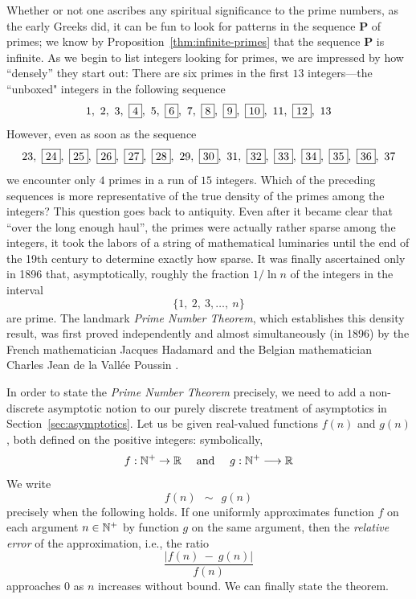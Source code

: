 Whether or not one ascribes any spiritual significance to the prime numbers, as the early Greeks did, it can be fun to look for patterns in the sequence {\bf P} of primes; we know by Proposition~\ref{thm:infinite-primes} that the sequence {\bf P} is infinite.  As we begin to list integers looking for primes, we are impressed by how ``densely'' they start out:  There are six primes in the first $13$ integers---the ``unboxed" integers in the following sequence
\[ 
1, \ 2, \ 3, \ \fbox{4}, \ 5, \ \fbox{6}, \ 7, \ \fbox{8}, \ \fbox{9}, \ \fbox{10}, \ 11, \ \fbox{12}, \ 13 
\] 
However, even as soon as the sequence
\[ 23, \ \fbox{24}, \ \fbox{25}, \ \fbox{26}, \ \fbox{27}, \ \fbox{28}, \ 29, \ \fbox{30}, \ 31, 
\ \fbox{32}, \ \fbox{33}, \ \fbox{34}, \ \fbox{35}, \ \fbox{36}, \ 37
\]
we encounter only $4$ primes in a run of $15$ integers.  Which of the preceding sequences is more representative of the true density of the primes among the integers?  This question goes back to antiquity.  Even after it became clear that ``over the long enough haul'', the primes were actually rather sparse among the integers, it took the labors of a string of mathematical luminaries until the  end of the 19th century to determine exactly how sparse.  It was finally ascertained only in 1896 that, asymptotically, roughly the fraction $1/ \ln n$ of the integers in the interval
\[ \{ 1, \ 2, \ 3, \ldots, \ n \} \]
are prime.  The landmark {\it Prime Number Theorem}, which establishes this density result, was first proved independently and almost simultaneously (in 1896) by the French mathematician Jacques Hadamard  \cite{Hadamard} and the Belgian mathematician Charles Jean de la Vall\'{e}e Poussin \cite{Poussin}.
 

\smallskip

In order to state the {\it Prime Number Theorem} precisely, we need to add a non-discrete asymptotic notion to our purely discrete treatment of asymptotics in Section~\ref{sec:asymptotics}.  Let us be given real-valued functions $f(n)$ and $g(n)$, both defined on the positive integers: symbolically,
\[
f: \mathbb{N}^+ \rightarrow  \mathbb{R} \ \ \ \mbox{ and } \ \ \
g: \mathbb{N}^+ \longrightarrow  \mathbb{R}
\]
We write
\[ f(n) \ \ \sim \ \ g(n) \]
precisely when the following holds.  If one uniformly approximates function $f$ on each argument $n \in \mathbb{N}^+$ by function $g$ on the same argument, then the {\it relative error} of the approximation, i.e., the ratio
\[ \frac{|f(n) \ - \ g(n)|}{f(n)} \]
approaches $0$ as $n$ increases without bound.  We can finally state the theorem.
\index{approximation, relative error}

